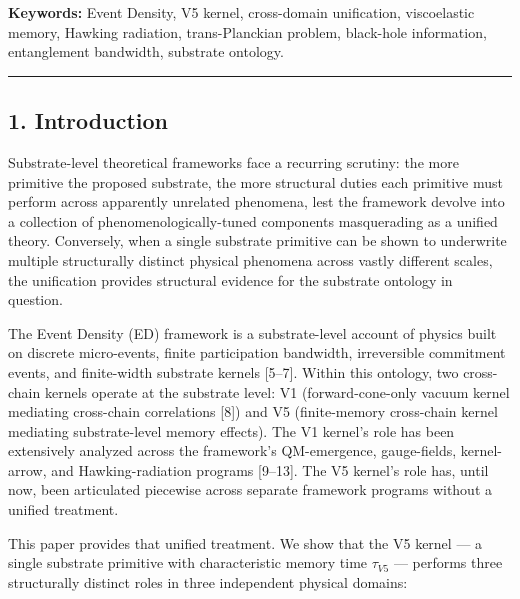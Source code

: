 \documentclass[
  11pt,
  a4paperpaper,
]{article}
\begin{document}
\textbf{Keywords:} Event Density, V5 kernel, cross-domain unification,
viscoelastic memory, Hawking radiation, trans-Planckian problem,
black-hole information, entanglement bandwidth, substrate ontology.

\begin{center}\rule{0.5\linewidth}{0.5pt}\end{center}

\subsection{1. Introduction}\label{introduction}

Substrate-level theoretical frameworks face a recurring scrutiny: the
more primitive the proposed substrate, the more structural duties each
primitive must perform across apparently unrelated phenomena, lest the
framework devolve into a collection of phenomenologically-tuned
components masquerading as a unified theory. Conversely, when a single
substrate primitive can be shown to underwrite multiple structurally
distinct physical phenomena across vastly different scales, the
unification provides structural evidence for the substrate ontology in
question.

The Event Density (ED) framework is a substrate-level account of physics
built on discrete micro-events, finite participation bandwidth,
irreversible commitment events, and finite-width substrate kernels
{[}5--7{]}. Within this ontology, two cross-chain kernels operate at the
substrate level: V1 (forward-cone-only vacuum kernel mediating
cross-chain correlations {[}8{]}) and V5 (finite-memory cross-chain
kernel mediating substrate-level memory effects). The V1 kernel's role
has been extensively analyzed across the framework's QM-emergence,
gauge-fields, kernel-arrow, and Hawking-radiation programs {[}9--13{]}.
The V5 kernel's role has, until now, been articulated piecewise across
separate framework programs without a unified treatment.

This paper provides that unified treatment. We show that the V5 kernel
--- a single substrate primitive with characteristic memory time
\(\tau_{V5}\) --- performs three structurally distinct roles in three
independent physical domains:
\end{document}
